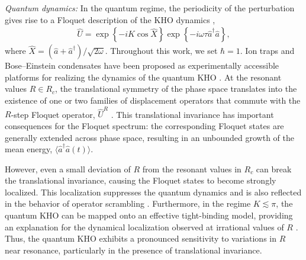 \documentclass[amsmath,nobibnotes,aps,amssymb,pra, prl,aps,showpacs,superscriptaddress,twocolumn, longbibliography, reprint]{revtex4-2}
\begin{document}
\textit{Quantum dynamics: }In the quantum regime, the periodicity of the perturbation gives rise to a Floquet description of the KHO dynamics \cite{berman1991problem,shepelyansky1992quantum,daly1994classical,kells2005quantum,daly1996non,engel2007quantum,kells2004dynamical},
\begin{eqnarray}
\hat{U}=\exp\left\{-iK\cos\hat{X}\right\}\exp\left\{-i\omega\tau\hat{a}^{\dagger}\hat{a}\right\},
\end{eqnarray}
where $\hat{X}=(\hat{a}+\hat{a}^{\dagger})/\sqrt{2\omega}$. Throughout this work, we set $\hbar=1$. Ion traps and Bose--Einstein condensates have been proposed as experimentally accessible platforms for realizing the dynamics of the quantum KHO \cite{Gardiner1997,carvalho2004web,gardiner2000nonlinear,duffy2004nonlinear,billam2009quantum}. At the resonant values $R\in R_c$, the translational symmetry of the phase space translates into the existence of one or two families of displacement operators that commute with the $R$-step Floquet operator, $\hat{U}^{R}$ \cite{borgonovi1995translational}. This translational invariance has important consequences for the Floquet spectrum: the corresponding Floquet states are generally extended across phase space, resulting in an unbounded growth of the mean energy, $\langle\hat{a}^{\dagger}\hat{a}(t)\rangle$.




However, even a small deviation of $R$ from the resonant values in $R_c$ can break the translational invariance, causing the Floquet states to become strongly localized. This localization suppresses the quantum dynamics and is also reflected in the behavior of operator scrambling \cite{varikuti2023probing}. Furthermore, in the regime $K\lesssim\pi$, the quantum KHO can be mapped onto an effective tight-binding model, providing an explanation for the dynamical localization observed at irrational values of $R$ \cite{frasca1997quantum,kells2005quantum}. Thus, the quantum KHO exhibits a pronounced sensitivity to variations in $R$ near resonance, particularly in the presence of translational invariance.
\end{document}
